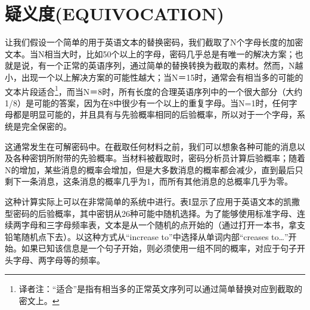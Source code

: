 \documentclass[]{article}
\begin{document}
\section{疑义度(EQUIVOCATION)}

让我们假设一个简单的用于英语文本的替换密码，我们截取了N个字母长度的加密文本。当N相当大时，比如50个以上的字母，密码几乎总是有唯一的解决方案；也就是说，有一个正常的英语序列，通过简单的替换转换为截取的素材。然而，N越小，出现一个以上解决方案的可能性越大；当N＝15时，通常会有相当多的可能的文本片段适合\footnote{译者注：“适合”是指有相当多的正常英文序列可以通过简单替换对应到截取的密文上。}，而当N＝8时，所有长度的合理英语序列中的一个很大部分（大约1/8）是可能的答案，因为在8中很少有一个以上的重复字母。当N=1时，任何字母都是明显可能的，并且具有与先验概率相同的后验概率，所以对于一个字母，系统是完全保密的。

这通常发生在可解密码中。在截取任何材料之前，我们可以想象各种可能的消息以及各种密钥所附带的先验概率。当材料被截取时，密码分析员计算后验概率；随着N的增加，某些消息的概率会增加，但是大多数消息的概率都会减少，直到最后只剩下一条消息，这条消息的概率几乎为1，而所有其他消息的总概率几乎为零。

这种计算实际上可以在非常简单的系统中进行。表I显示了应用于英语文本的凯撒型密码的后验概率，其中密钥从26种可能中随机选择。为了能够使用标准字母、连续两字母和三字母频率表，文本是从一个随机的点开始的（通过打开一本书，拿支铅笔随机点下去）。以这种方式从“increase to”中选择从单词内部“creases to…”开始。如果已知该信息是一个句子开始，则必须使用一组不同的概率，对应于句子开头字母、两字母等的频率。
\end{document}
